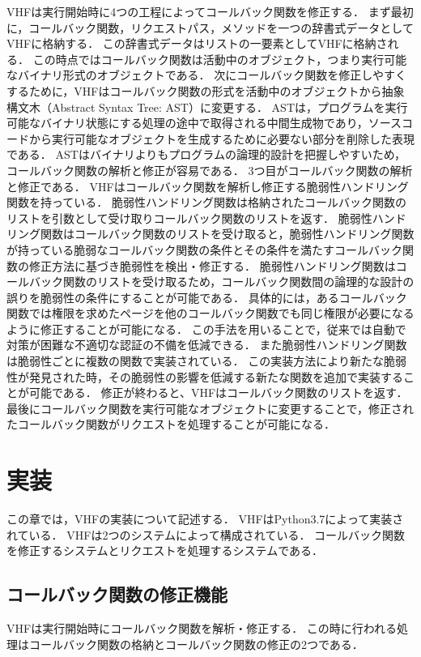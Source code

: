 \documentclass[a4paper,12pt]{jreport}
\begin{document}
VHFは実行開始時に4つの工程によってコールバック関数を修正する．
まず最初に，コールバック関数，リクエストパス，メソッドを一つの辞書式データとしてVHFに格納する．
この辞書式データはリストの一要素としてVHFに格納される．
この時点ではコールバック関数は活動中のオブジェクト，つまり実行可能なバイナリ形式のオブジェクトである．
次にコールバック関数を修正しやすくするために，VHFはコールバック関数の形式を活動中のオブジェクトから抽象構文木（Abstract Syntax Tree: AST）に変更する．
ASTは，プログラムを実行可能なバイナリ状態にする処理の途中で取得される中間生成物であり，ソースコードから実行可能なオブジェクトを生成するために必要ない部分を削除した表現である．
ASTはバイナリよりもプログラムの論理的設計を把握しやすいため，コールバック関数の解析と修正が容易である．
3つ目がコールバック関数の解析と修正である．
VHFはコールバック関数を解析し修正する脆弱性ハンドリング関数を持っている．
脆弱性ハンドリング関数は格納されたコールバック関数のリストを引数として受け取りコールバック関数のリストを返す．
脆弱性ハンドリング関数はコールバック関数のリストを受け取ると，脆弱性ハンドリング関数が持っている脆弱なコールバック関数の条件とその条件を満たすコールバック関数の修正方法に基づき脆弱性を検出・修正する．
脆弱性ハンドリング関数はコールバック関数のリストを受け取るため，コールバック関数間の論理的な設計の誤りを脆弱性の条件にすることが可能である．
具体的には，あるコールバック関数では権限を求めたページを他のコールバック関数でも同じ権限が必要になるように修正することが可能になる．
この手法を用いることで，従来では自動で対策が困難な不適切な認証の不備を低減できる．
また脆弱性ハンドリング関数は脆弱性ごとに複数の関数で実装されている．
この実装方法により新たな脆弱性が発見された時，その脆弱性の影響を低減する新たな関数を追加で実装することが可能である．
修正が終わると、VHFはコールバック関数のリストを返す．
最後にコールバック関数を実行可能なオブジェクトに変更することで，修正されたコールバック関数がリクエストを処理することが可能になる．

\chapter{実装}
この章では，VHFの実装について記述する．
VHFはPython3.7によって実装されている．
VHFは2つのシステムによって構成されている．
コールバック関数を修正するシステムとリクエストを処理するシステムである．

\section{コールバック関数の修正機能}
VHFは実行開始時にコールバック関数を解析・修正する．
この時に行われる処理はコールバック関数の格納とコールバック関数の修正の2つである．
\end{document}
